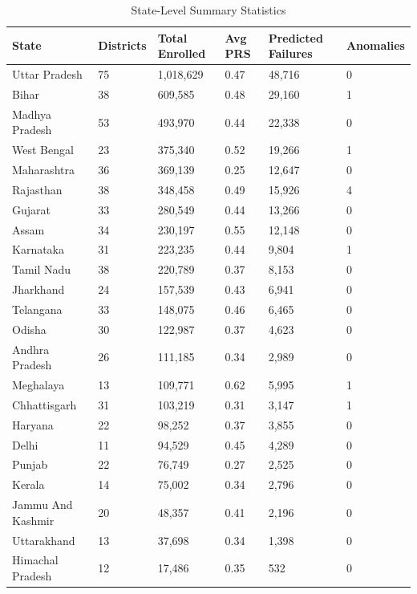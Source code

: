 \documentclass[11pt, a4paper]{article}
\begin{document}
\vspace{0.8em}
\begin{table}[H]
\caption{State-Level Summary Statistics}
{\scriptsize
\begin{tabularx}{\textwidth}{|Y|Y|Y|Y|Y|Y|}
\hline
\textbf{State} & \textbf{Districts} & \textbf{Total Enrolled} & \textbf{Avg PRS} & \textbf{Predicted Failures} & \textbf{Anomalies} \\ \hline
Uttar Pradesh & 75 & 1,018,629 & 0.47 & 48,716 & 0 \\ \hline
Bihar & 38 & 609,585 & 0.48 & 29,160 & 1 \\ \hline
Madhya Pradesh & 53 & 493,970 & 0.44 & 22,338 & 0 \\ \hline
West Bengal & 23 & 375,340 & 0.52 & 19,266 & 1 \\ \hline
Maharashtra & 36 & 369,139 & 0.25 & 12,647 & 0 \\ \hline
Rajasthan & 38 & 348,458 & 0.49 & 15,926 & 4 \\ \hline
Gujarat & 33 & 280,549 & 0.44 & 13,266 & 0 \\ \hline
Assam & 34 & 230,197 & 0.55 & 12,148 & 0 \\ \hline
Karnataka & 31 & 223,235 & 0.44 & 9,804 & 1 \\ \hline
Tamil Nadu & 38 & 220,789 & 0.37 & 8,153 & 0 \\ \hline
Jharkhand & 24 & 157,539 & 0.43 & 6,941 & 0 \\ \hline
Telangana & 33 & 148,075 & 0.46 & 6,465 & 0 \\ \hline
Odisha & 30 & 122,987 & 0.37 & 4,623 & 0 \\ \hline
Andhra Pradesh & 26 & 111,185 & 0.34 & 2,989 & 0 \\ \hline
Meghalaya & 13 & 109,771 & 0.62 & 5,995 & 1 \\ \hline
Chhattisgarh & 31 & 103,219 & 0.31 & 3,147 & 1 \\ \hline
Haryana & 22 & 98,252 & 0.37 & 3,855 & 0 \\ \hline
Delhi & 11 & 94,529 & 0.45 & 4,289 & 0 \\ \hline
Punjab & 22 & 76,749 & 0.27 & 2,525 & 0 \\ \hline
Kerala & 14 & 75,002 & 0.34 & 2,796 & 0 \\ \hline
Jammu And Kashmir & 20 & 48,357 & 0.41 & 2,196 & 0 \\ \hline
Uttarakhand & 13 & 37,698 & 0.34 & 1,398 & 0 \\ \hline
Himachal Pradesh & 12 & 17,486 & 0.35 & 532 & 0 \\ \hline

\end{tabularx}}
\end{table}
\end{document}
